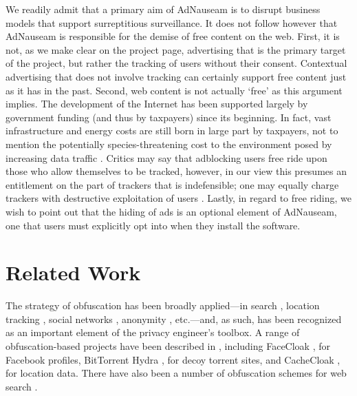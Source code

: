\documentclass[conference]{IEEEtran}
\begin{document}
We readily admit that a primary aim of AdNauseam is to disrupt business models that support surreptitious surveillance. It does not follow however that AdNauseam is responsible for the demise of free content on the web. First, it is not, as we make clear on the project page, advertising that is the primary target of the project, but rather the tracking of users without their consent. Contextual advertising that does not involve tracking can certainly support free content just as it has in the past. Second, web content is not actually ‘free’ as this argument implies. The development of the Internet has been supported largely by government funding (and thus by taxpayers) since its beginning. In fact, vast infrastructure and energy costs are still born in large part by taxpayers, not to mention the potentially species-threatening cost to the environment posed by increasing data traffic \cite{Hazas}. Critics may say that adblocking users free ride upon those who allow themselves to be tracked, however, in our view this presumes an entitlement on the part of trackers that is indefensible; one may equally charge trackers with destructive exploitation of users \cite{Brunton}. Lastly, in regard to free riding, we wish to point out that the hiding of ads is an optional element of AdNauseam, one that users must explicitly opt into when they install the software.




\section{Related Work}

The strategy of obfuscation has been broadly applied---in search \cite{Howe-1}, location tracking \cite{Meyerowitz}, social networks \cite{Luo}, anonymity \cite{Chakravarty, Schulze}, etc.---and, as such, has been recognized as an important element of the privacy engineer's toolbox. A range of obfuscation-based projects have been described in \cite{Brunton}, including FaceCloak \cite{Luo}, for Facebook profiles, BitTorrent Hydra \cite{Schulze}, for decoy torrent sites, and CacheCloak \cite{Meyerowitz}, for location data. There have also been a number of obfuscation schemes for web search \cite{Balsa}.
\end{document}
